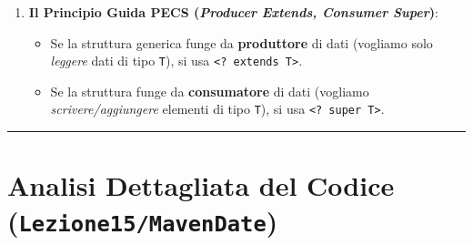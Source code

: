 \documentclass[11pt,a4paper,oneside]{report}
\newcommand{\passthrough}[1]{#1}
\providecommand{\tightlist}{\setlength{\itemsep}{0pt}\setlength{\parskip}{0pt}}
\begin{document}
\begin{enumerate}
\begin{itemize}
\begin{lstlisting}[language=Java]
System.out.println(pairP.getFirst().getName()); // OK!
\end{lstlisting}
  \item
    \textbf{Sintassi pulita nei metodi}: Invece di dichiarare un
    parametro formale di tipo esplicito a livello di metodo:

\begin{lstlisting}[language=Java]
<T extends Person> void printPair(Pair<T> p) { ... }
\end{lstlisting}

    possiamo scrivere in modo molto più compatto e leggibile:

\begin{lstlisting}[language=Java]
void printPair(Pair<? extends Person> p) { ... }
\end{lstlisting}
  \end{itemize}
\item
  \textbf{Il Principio Guida PECS (\emph{Producer Extends, Consumer
  Super})}:

  \begin{itemize}
  \tightlist
  \item
    Se la struttura generica funge da \textbf{produttore} di dati
    (vogliamo solo \emph{leggere} dati di tipo
    \passthrough{\lstinline!T!}), si usa
    \passthrough{\lstinline!<? extends T>!}.
  \item
    Se la struttura funge da \textbf{consumatore} di dati (vogliamo
    \emph{scrivere/aggiungere} elementi di tipo
    \passthrough{\lstinline!T!}), si usa
    \passthrough{\lstinline!<? super T>!}.
  \end{itemize}
\end{enumerate}

\begin{center}\rule{0.5\linewidth}{0.5pt}\end{center}

\section{\texorpdfstring{Analisi Dettagliata del Codice
(\texttt{Lezione15/MavenDate})}{Analisi Dettagliata del Codice (Lezione15/MavenDate)}}\label{chap14_analisi-dettagliata-del-codice-lezione15mavendate}
\end{document}
